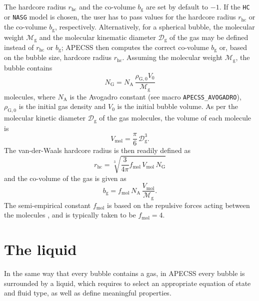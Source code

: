 The hardcore radius $r_\mathrm{hc}$ and the co-volume $b_\mathrm{g}$ are set by default to $-1$. If the {\tt HC} or {\tt NASG} model is chosen, the user has to pass values for the hardcore radius $r_\mathrm{hc}$ or the co-volume $b_\mathrm{g}$, respectively. Alternatively, for a spherical bubble, the molecular weight $\mathcal{M}_{\text{g}}$ and the molecular kinematic diameter $\mathcal{D}_{\text{g}}$ of the gas may be defined instead of $r_\mathrm{hc}$ or $b_\mathrm{g}$; APECSS then computes the correct co-volume $b_\mathrm{g}$ or, based on the bubble size, hardcore radius $r_\mathrm{hc}$. Assuming the molecular weight $\mathcal{M}_{\text{g}}$, the bubble contains 
\begin{equation}
    N_\mathrm{G} = N_\mathrm{A} \, \frac{\rho_{\mathrm{G},0} V_0}{\mathcal{M}_{\text{g}}} 
\end{equation}
molecules, where $N_\mathrm{A}$ is the Avogadro constant (see macro {\tt APECSS\_AVOGADRO}), $\rho_{\mathrm{G},0}$ is the initial gas density and $V_0$ is the initial bubble volume. As per the molecular kinetic diameter $\mathcal{D}_{\text{g}}$ of the gas molecules, the volume of each molecule is
\begin{equation}
    V_\mathrm{mol} = \frac{\pi}{6} \, \mathcal{D}_{\text{g}}^3.
\end{equation}
The van-der-Waals hardcore radius is then readily defined as
\begin{equation}
    r_\mathrm{hc} = \sqrt[3]{\frac{3}{4 \pi} f_\mathrm{mol} \, V_\mathrm{mol} \, N_\mathrm{G}}
\end{equation}
and the co-volume of the gas is given as
\begin{equation}
    b_\mathrm{g} = f_\mathrm{mol} \, N_\mathrm{A} \, \frac{V_\mathrm{mol}}{\mathcal{M}_{\text{g}}}.
\end{equation}
The semi-empirical constant $f_\mathrm{mol}$ is based on the repulsive forces acting between the molecules \citep{Kontogeorgis2019}, and is typically taken to be $f_\mathrm{mol}=4$.


\section{The liquid}
\label{sec:liquid}

In the same way that every bubble contains a gas, in APECSS every bubble is surrounded by a liquid, which requires to select an appropriate equation of state and fluid type, as well as define meaningful properties.

\vspace{0.8em}

